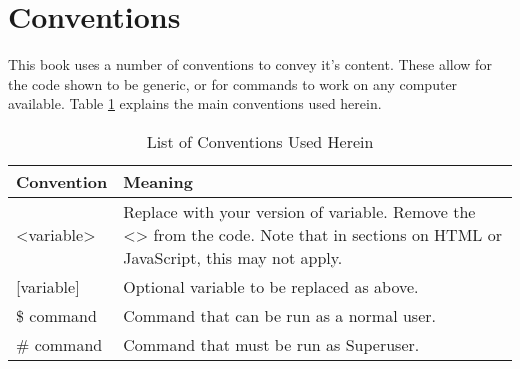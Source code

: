 \documentclass[twoside,b5paper,11pt]{report}
\begin{document}
	\section*{Conventions}
		This book uses a number of conventions to convey it's content.
		These allow for the code shown to be generic, or for commands to work on any computer available.
		Table \ref{tab:BookConventions} explains the main conventions used herein.
		\begin{table}[htb]
			\centering
			\begin{tabular}{l p{7cm}}
				\toprule
				\textbf{Convention} & \textbf{Meaning} \\
				\toprule
				<variable> & Replace with your version of variable.
								Remove the <> from the code.
								Note that in sections on HTML or JavaScript, this may not apply. \\ \vspace{0cm}
				[variable] & Optional variable to be replaced as above. \\
				\$ command & Command that can be run as a normal user. \\
				\# command & Command that must be run as Superuser. \\
				\bottomrule
			\end{tabular}
			\caption{List of Conventions Used Herein}
			\label{tab:BookConventions}
		\end{table}
\mainmatter















\appendix
	\label{ch:Appendix}
	
	
	\printindex
\end{document}
